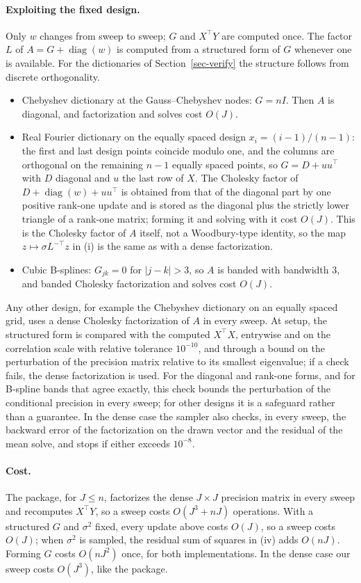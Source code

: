 \paragraph*{Exploiting the fixed design.} Only $w$ changes from sweep to sweep; $G$ and $X^\top Y$ are computed once. The factor $L$ of $A=G+\operatorname{diag}(w)$ is computed from a structured form of $G$ whenever one is available. For the dictionaries of Section~\ref{sec-verify} the structure follows from discrete orthogonality.
\begin{itemize}
\item Chebyshev dictionary at the Gauss--Chebyshev nodes: $G=nI$. Then $A$ is diagonal, and factorization and solves cost $O(J)$.
\item Real Fourier dictionary on the equally spaced design $x_i=(i-1)/(n-1)$: the first and last design points coincide modulo one, and the columns are orthogonal on the remaining $n-1$ equally spaced points, so $G=D+uu^\top$ with $D$ diagonal and $u$ the last row of $X$. The Cholesky factor of $D+\operatorname{diag}(w)+uu^\top$ is obtained from that of the diagonal part by one positive rank-one update and is stored as the diagonal plus the strictly lower triangle of a rank-one matrix; forming it and solving with it cost $O(J)$. This is the Cholesky factor of $A$ itself, not a Woodbury-type identity, so the map $z\mapsto\sigma L^{-\top}z$ in (i) is the same as with a dense factorization.
\item Cubic B-splines: $G_{jk}=0$ for $|j-k|>3$, so $A$ is banded with bandwidth $3$, and banded Cholesky factorization and solves cost $O(J)$.
\end{itemize}
Any other design, for example the Chebyshev dictionary on an equally spaced grid, uses a dense Cholesky factorization of $A$ in every sweep. At setup, the structured form is compared with the computed $X^\top X$, entrywise and on the correlation scale with relative tolerance $10^{-10}$, and through a bound on the perturbation of the precision matrix relative to its smallest eigenvalue; if a check fails, the dense factorization is used. For the diagonal and rank-one forms, and for B-spline bands that agree exactly, this check bounds the perturbation of the conditional precision in every sweep; for other designs it is a safeguard rather than a guarantee. In the dense case the sampler also checks, in every sweep, the backward error of the factorization on the drawn vector and the residual of the mean solve, and stops if either exceeds $10^{-8}$.

\paragraph*{Cost.} The package, for $J\leq n$, factorizes the dense $J\times J$ precision matrix in every sweep and recomputes $X^\top Y$, so a sweep costs $O(J^3+nJ)$ operations. With a structured $G$ and $\sigma^2$ fixed, every update above costs $O(J)$, so a sweep costs $O(J)$; when $\sigma^2$ is sampled, the residual sum of squares in (iv) adds $O(nJ)$. Forming $G$ costs $O(nJ^2)$ once, for both implementations. In the dense case our sweep costs $O(J^3)$, like the package.

